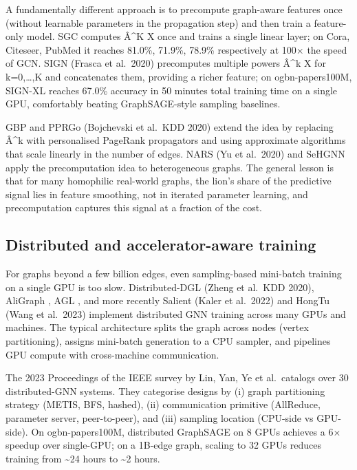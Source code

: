 \documentclass{article}
\begin{document}
A fundamentally different approach is to precompute graph-aware features once (without learnable parameters in the propagation step) and then train a feature-only model. SGC \citep{wu2019graphwavenetfordee} computes Â\^{}K X once and trains a single linear layer; on Cora, Citeseer, PubMed it reaches 81.0\%, 71.9\%, 78.9\% respectively at 100× the speed of GCN. SIGN (Frasca et al.~2020) precomputes multiple powers Â\^{}k X for k=0,\ldots,K and concatenates them, providing a richer feature; on ogbn-papers100M, SIGN-XL reaches 67.0\% accuracy in 50 minutes total training time on a single GPU, comfortably beating GraphSAGE-style sampling baselines.

GBP \citep{chen2020measuringandreliev} and PPRGo (Bojchevski et al.~KDD 2020) extend the idea by replacing Â\^{}k with personalised PageRank propagators and using approximate algorithms that scale linearly in the number of edges. NARS (Yu et al.~2020) and SeHGNN \citep{liu20242025} apply the precomputation idea to heterogeneous graphs. The general lesson is that for many homophilic real-world graphs, the lion's share of the predictive signal lies in feature smoothing, not in iterated parameter learning, and precomputation captures this signal at a fraction of the cost.

\subsection{Distributed and accelerator-aware training}\label{distributed-and-accelerator-aware-training}

For graphs beyond a few billion edges, even sampling-based mini-batch training on a single GPU is too slow. Distributed-DGL (Zheng et al.~KDD 2020), AliGraph \citep{yang2020heterogeneousnetwo}, AGL \citep{zhang2020gnnguarddefendingg}, and more recently Salient (Kaler et al.~2022) and HongTu (Wang et al.~2023) implement distributed GNN training across many GPUs and machines. The typical architecture splits the graph across nodes (vertex partitioning), assigns mini-batch generation to a CPU sampler, and pipelines GPU compute with cross-machine communication.

The 2023 Proceedings of the IEEE survey by Lin, Yan, Ye et al.~catalogs over 30 distributed-GNN systems. They categorise designs by (i) graph partitioning strategy (METIS, BFS, hashed), (ii) communication primitive (AllReduce, parameter server, peer-to-peer), and (iii) sampling location (CPU-side vs GPU-side). On ogbn-papers100M, distributed GraphSAGE on 8 GPUs achieves a 6× speedup over single-GPU; on a 1B-edge graph, scaling to 32 GPUs reduces training from \textasciitilde24 hours to \textasciitilde2 hours.
\end{document}
